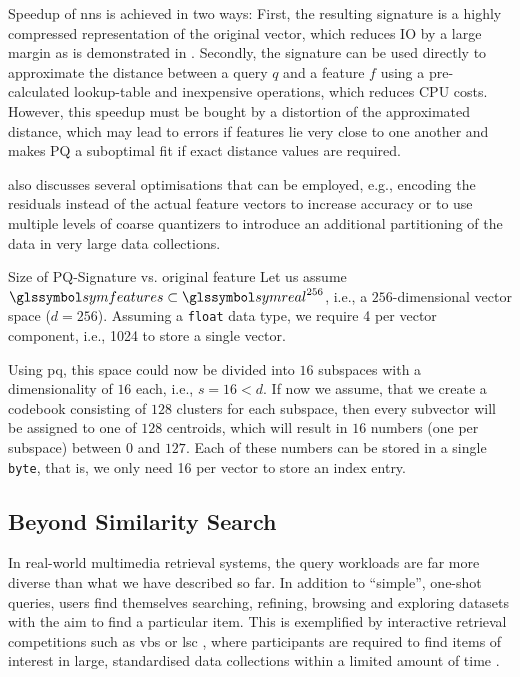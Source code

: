 Speedup of \acrshort{nns} is achieved in two ways: First, the resulting signature is a highly compressed representation of the original vector, which reduces IO by a large margin as is demonstrated in . Secondly, the signature can be used directly to approximate the distance between a query $q$ and a feature $f$ using a pre-calculated lookup-table and inexpensive operations, which reduces CPU costs. However, this speedup must be bought by a distortion of the approximated distance, which may lead to errors if features lie very close to one another and makes PQ a suboptimal fit if exact distance values are required.

\cite{Jegou:2010Product} also discusses several optimisations that can be employed, e.g., encoding the residuals instead of the actual feature vectors to increase accuracy or to use multiple levels of coarse quantizers to introduce an additional partitioning of the data in very large data collections.

\begin{example}[label=example:pq_compression]{Size of PQ-Signature vs. original feature}{}
    Let us assume $\symfeatures \subset \symreal^{256}$, i.e., a $256$-dimensional vector space ($d = 256$). Assuming a \texttt{float} data type, we require \SI{4}{\byte} per vector component, i.e., \SI{1024}{\byte} to store a single vector.
    
    Using \acrshort{pq}, this space could now be divided into $16$ subspaces with a dimensionality of $16$ each, i.e., $s = 16 < d$. If now we assume, that we create a codebook consisting of $128$ clusters for each subspace, then every subvector will be assigned to one of $128$ centroids, which will result in $16$ numbers (one per subspace) between $0$ and $127$. Each of these numbers can be stored in a single \texttt{byte}, that is, we only need \SI{16}{\byte} per vector to store an index entry.
\end{example}

\subsection{Beyond Similarity Search}
In real-world multimedia retrieval systems, the query workloads are far more diverse than what we have described so far. In addition to ``simple'', one-shot queries, users find themselves searching, refining, browsing and exploring datasets with the aim to find a particular item. This is exemplified by interactive retrieval competitions such as \acrfull{vbs} \cite{Schoeffmann:2019Video} or \acrfull{lsc} \cite{Gurrin:2021Introduction}, where participants are required to find items of interest in large, standardised data collections within a limited amount of time \cite{Berns:2019V3C1,Rossetto:2021Insights,Gurrin:2021Introduction}.

